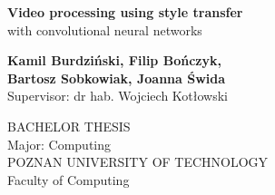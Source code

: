 
\begin{titlepage}
	
	
	\thispagestyle{frontpage}
	
	\begin{center}
		
		\vspace*{6\baselineskip}
	
		
		{\huge \textbf{Video processing using style transfer \\}}
		\Large{{with convolutional neural networks}}\\
		
        \vspace*{1,5\baselineskip}

		\large{\textbf{Kamil Burdziński, Filip Bończyk, \\Bartosz Sobkowiak, Joanna Świda}}\\
		\vspace{0,5\baselineskip}
		\large{{Supervisor: dr hab. Wojciech Kotłowski }}\\
		
		\vspace{6\baselineskip}
		
		\large {BACHELOR THESIS}\\
		\large{Major: Computing}\\
		
		\vspace{1,5\baselineskip}
		\large{POZNAN UNIVERSITY OF TECHNOLOGY}\\
		\large{Faculty of Computing}\\

	\end{center}
	
	\vspace*{4\baselineskip}

	
\end{titlepage}